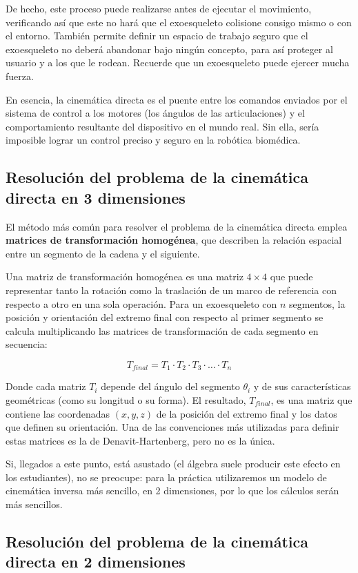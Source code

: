 \documentclass[10pt,a4paper,spanish]{article}
\begin{document}
De hecho, este proceso puede realizarse antes de ejecutar el movimiento, verificando así que este no hará que el exoesqueleto colisione consigo mismo o con el entorno. También permite definir un espacio de trabajo seguro que el exoesqueleto no deberá abandonar bajo ningún concepto, para así proteger al usuario y a los que le rodean. Recuerde que un exoesqueleto puede ejercer mucha fuerza.

En esencia, la cinemática directa es el puente entre los comandos enviados por el sistema de control a los motores (los ángulos de las articulaciones) y el comportamiento resultante del dispositivo en el mundo real. Sin ella, sería imposible lograr un control preciso y seguro en la robótica biomédica.

\subsection{Resolución del problema de la cinemática directa en 3 dimensiones}

El método más común para resolver el problema de la cinemática directa emplea \textbf{matrices de transformación homogénea}, que describen la relación espacial entre un segmento de la cadena y el siguiente.

Una matriz de transformación homogénea es una matriz $4\times4$ que puede representar tanto la rotación como la traslación de un marco de referencia con respecto a otro en una sola operación. Para un exoesqueleto con $n$ segmentos, la posición y orientación del extremo final con respecto al primer segmento se calcula multiplicando las matrices de transformación de cada segmento en secuencia:

$$T_{final} = T_1 \cdot T_2 \cdot T_3 \cdot \ldots \cdot T_n$$

Donde cada matriz $T_i$ depende del ángulo del segmento $\theta_i$ y de sus características geométricas (como su longitud o su forma). El resultado, $T_{final}$, es una matriz que contiene las coordenadas $(x, y, z)$ de la posición del extremo final y los datos que definen su orientación. Una de las convenciones más utilizadas para definir estas matrices es la de Denavit-Hartenberg, pero no es la única.

Si, llegados a este punto, está asustado (el álgebra suele producir este efecto en los estudiantes), no se preocupe: para la práctica utilizaremos un modelo de cinemática inversa más sencillo, en 2 dimensiones, por lo que los cálculos serán más sencillos.

\subsection{Resolución del problema de la cinemática directa en 2 dimensiones}
\label{sec:problema2d}
\end{document}
